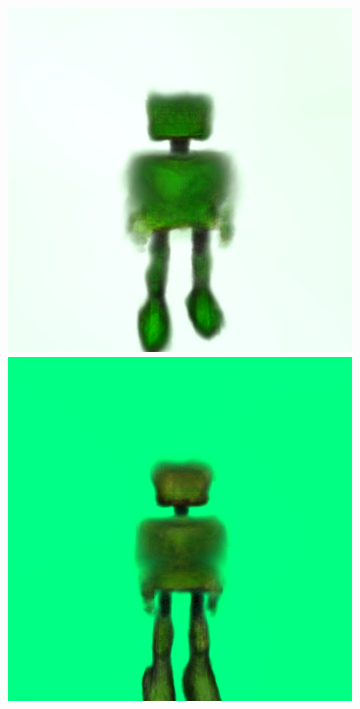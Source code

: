 \begin{figure}[H]
\begin{subfigure}[b]{0.20\textwidth}
        \includegraphics[width=\textwidth]{figures/generationProcess/dreamfusion_plantrobot_5000_part1.png}
        \includegraphics[width=\textwidth]{figures/generationProcess/dreamfusion_plantrobot_10000_part1.png}

\end{subfigure}
\end{figure}
